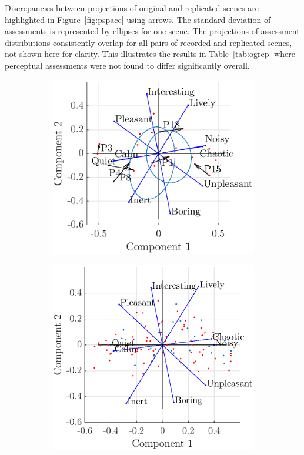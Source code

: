 \documentclass[11pt,a4paper]{article}
\begin{document}
Discrepancies between projections of original and replicated scenes are highlighted in Figure~\ref{fig:pspace} using arrows. The standard deviation of assessments is represented by ellipses for one scene. The projections of assessment distributions consistently overlap for all pairs of recorded and replicated scenes, not shown here for clarity. This illustrates the results in Table~\ref{tab:ogrep} where perceptual assessments were not found to differ significantly overall.\\

\begin{figure}[h]
    \centering
     \begin{subfigure}[t]{0.55\textwidth}
        \centering
        \includegraphics[width=\textwidth]{figures/pca_p1.eps}
    \end{subfigure}%
    \begin{subfigure}[t]{0.5\textwidth}
        \centering
        \includegraphics[width=\textwidth]{figures/pca_sim.eps}

\end{subfigure}
\end{figure}
\end{document}

